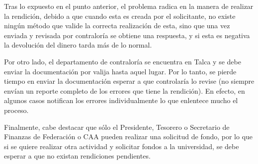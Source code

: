 Tras lo expuesto en el punto anterior, el problema radica en la manera de realizar la rendición, debido a que cuando esta es creada por el solicitante, no existe ningún método que valide la correcta realización de esta, sino que una vez enviada y revisada por contraloría se obtiene una respuesta, y si esta es negativa la devolución del dinero tarda más de lo normal.

Por otro lado, el departamento de contraloría se encuentra en Talca y se debe enviar la documentación por valija hasta aquel lugar. Por lo tanto, se pierde tiempo en enviar la documentación esperar a que controlaría lo revise (no siempre envían un reporte completo de los errores que tiene la rendición). En efecto, en algunos casos notifican los errores individualmente lo que enlentece mucho el proceso.

Finalmente, cabe destacar que sólo el Presidente, Tesorero o Secretario de Finanzas de Federación o CAA pueden realizar una solicitud de fondo, por lo que si se quiere realizar otra actividad y solicitar fondos a la universidad, se debe esperar a que no existan rendiciones pendientes.
